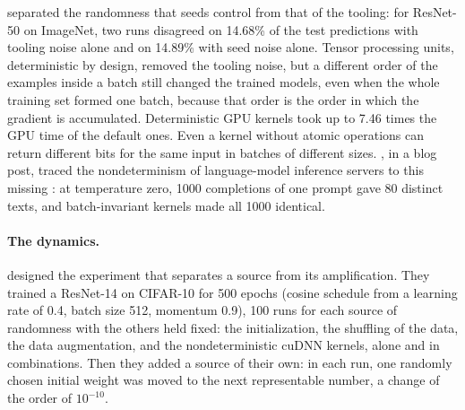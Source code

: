 \begin{refsection}
\Textcite{ZhuangEtAl2022} separated the randomness that seeds control from that of the tooling: for ResNet-50 on ImageNet, two runs disagreed on 14.68\% of the test predictions with tooling noise alone and on 14.89\% with seed noise alone. Tensor processing units, deterministic by design, removed the tooling noise, but a different order of the examples inside a batch still changed the trained models, even when the whole training set formed one batch, because that order is the order in which the gradient is accumulated. Deterministic GPU kernels took up to 7.46 times the GPU time of the default ones. Even a kernel without atomic operations can return different bits for the same input in batches of different sizes. \Textcite{He2025}, in a blog post, traced the nondeterminism of language-model inference servers to this missing : at temperature zero, 1000 completions of one prompt gave 80 distinct texts, and batch-invariant kernels made all 1000 identical.

\paragraph{The dynamics.} \Textcite{SummersDinneen2021} designed the experiment that separates a source from its amplification. They trained a ResNet-14 on CIFAR-10 for 500 epochs (cosine schedule from a learning rate of 0.4, batch size 512, momentum 0.9), 100 runs for each source of randomness with the others held fixed: the initialization, the shuffling of the data, the data augmentation, and the nondeterministic cuDNN kernels, alone and in combinations. Then they added a source of their own: in each run, one randomly chosen initial weight was moved to the next representable number, a change of the order of $10^{-10}$.



\end{refsection}
